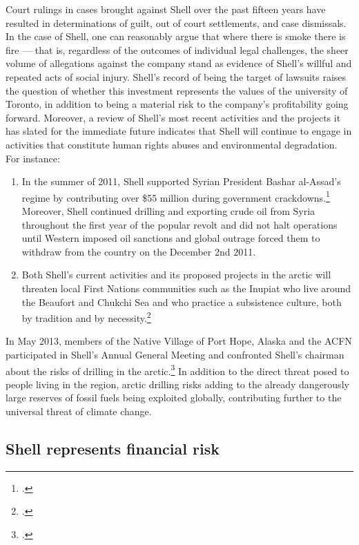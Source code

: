 	
Court rulings in cases brought against Shell over the past fifteen years have resulted in determinations of guilt, out of court settlements, and case dismissals. 
In the case of Shell, one can reasonably argue that where there is smoke there is fire --- that is, regardless of the outcomes of individual legal challenges, the sheer volume of allegations against the company stand as evidence of Shell's willful and repeated acts of social injury.
Shell's record of being the target of lawsuits raises the question of whether this investment represents the values of the university of Toronto, in addition to being a material risk to the company's profitability going forward.
Moreover, a review of Shell's most recent activities and the projects it has slated for the immediate future indicates that Shell will continue to engage in activities that constitute human rights abuses and environmental degradation.
For instance:
\begin{enumerate}
	\item In the summer of 2011, Shell supported Syrian President Bashar al-Assad's regime by contributing over \$55 million during government crackdowns.\footcite[][]{Syria_2011} Moreover, Shell continued drilling and exporting crude oil from Syria throughout the first year of the popular revolt and did not halt operations until Western imposed oil sanctions and global outrage forced them to withdraw from the country on the December 2nd 2011.
	\item Both Shell's current activities and its proposed projects in the arctic will threaten local First Nations communities such as the Inupiat who live around the Beaufort and Chukchi Sea and who practice a subsistence culture, both by tradition and by necessity.\footcite[][p. 13]{RiskingRuin_2012}
\end{enumerate}
In May 2013, members of the Native Village of Port Hope, Alaska and the ACFN participated in Shell's Annual General Meeting and confronted Shell's chairman about the risks of drilling in the arctic.\footcite{ShellArcticOilRush}
In addition to the direct threat posed to people living in the region, arctic drilling risks adding to the already dangerously large reserves of fossil fuels being exploited globally, contributing further to the universal threat of climate change.



	\subsection{Shell represents financial risk}
	


